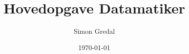 \documentclass{report}
\begin{document}
    \title{Hovedopgave Datamatiker}
    \author{Simon Gredal}
    \date{\today}
    \maketitle
    
    \begin{frontmatter}
        
    \end{frontmatter}

    \begin{mainmatter}
        
        
        
        
    \end{mainmatter}

    \begin{backmatter}
        
    \end{backmatter}
\end{document}
